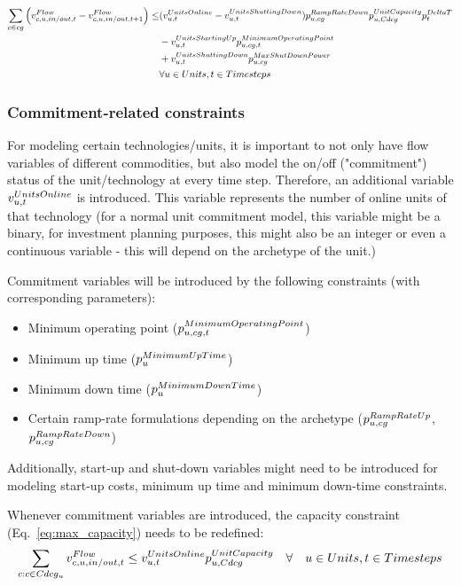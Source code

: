 \documentclass[10pt,english]{article}
\begin{document}
\begin{align} \label{eq:downdwardrampingconstraintwithcommitmentvariables}
\sum_{\commodity \in cg} \Big( \vFlow - \vFlow[\commodity,\unit,in/out,\timestep+1] \Big) \le &(\vUnitsOnline-\vUnitsShuttingDown) \pRampRateDown \pUnitCapacity \pDeltaT \nonumber \\
& - \vUnitsStartingUp \pMinimumOperatingPoint \nonumber \\
& + \vUnitsShuttingDown \pMaxShutDownPower \nonumber \\
& \forall \units, \timesteps
\end{align}






\subsubsection{Commitment-related constraints}
For modeling certain technologies/units, it is important to not only have flow variables of different commodities, but also model the on/off ("commitment") status of the unit/technology at every time step. Therefore, an additional variable $\vUnitsOnline$ is introduced. This variable represents the number of online units of that technology (for a normal unit commitment model, this variable might be a binary, for investment planning purposes, this might also be an integer or even a continuous variable - this will depend on the archetype of the unit.)

Commitment variables will be introduced by the following constraints (with corresponding parameters):
\begin{itemize}
	\item Minimum operating point ($\pMinimumOperatingPoint$)
	\item Minimum up time ($\pMinimumUpTime$)
	\item Minimum down time ($\pMinimumDownTime$)
	\item Certain ramp-rate formulations depending on the archetype ($\pRampRateUp$, $\pRampRateDown$)
\end{itemize}

Additionally, start-up and shut-down variables might need to be introduced for modeling start-up costs, minimum up time and minimum down-time constraints.

Whenever commitment variables are introduced, the capacity constraint (Eq.~\eqref{eq:max_capacity}) needs to be redefined:
\begin{equation} \label{eq:maximumoperatingpoint}
\sum_{\commodity : \commodity \in Cdcg_{\unit}} \vFlow \le \vUnitsOnline \pUnitCapacity \quad \forall \quad \units, \timesteps
\end{equation}
\end{document}
